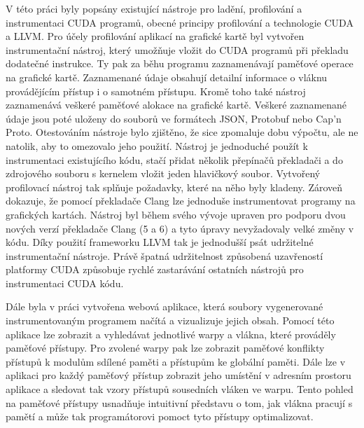 V této práci byly popsány existující nástroje pro ladění, profilování a instrumentaci CUDA programů, obecné principy profilování a technologie CUDA a LLVM. Pro účely profilování aplikací na grafické kartě byl vytvořen instrumentační nástroj, který umožňuje vložit do CUDA programů při překladu dodatečné instrukce. Ty pak za běhu programu zaznamenávají paměťové operace na grafické kartě. Zaznamenané údaje obsahují detailní informace o vláknu provádějícím přístup i o samotném přístupu. Kromě toho také nástroj zaznamenává veškeré paměťové alokace na grafické kartě. Veškeré zaznamenané údaje jsou poté uloženy do souborů ve formátech JSON, Protobuf nebo Cap'n Proto. Otestováním nástroje bylo zjištěno, že sice zpomaluje dobu výpočtu, ale ne natolik, aby to omezovalo jeho použití. Nástroj je jednoduché použít k instrumentaci existujícího kódu, stačí přidat několik přepínačů překladači a do zdrojového souboru s kernelem vložit jeden hlavičkový soubor. Vytvořený profilovací nástroj tak splňuje požadavky, které na něho byly kladeny. Zároveň dokazuje, že pomocí překladače Clang lze jednoduše instrumentovat programy na grafických kartách. Nástroj byl během svého vývoje upraven pro podporu dvou nových verzí překladače Clang (5 a 6) a tyto úpravy nevyžadovaly velké změny v kódu. Díky použití frameworku LLVM tak je jednodušší psát udržitelné instrumentační nástroje. Právě špatná udržitelnost způsobená uzavřeností platformy CUDA způsobuje rychlé zastarávání ostatních nástrojů pro instrumentaci CUDA kódu.

Dále byla v práci vytvořena webová aplikace, která soubory vygenerované instrumentovaným programem načítá a vizualizuje jejich obsah. Pomocí této aplikace lze zobrazit a vyhledávat jednotlivé warpy a vlákna, které prováděly paměťové přístupy. Pro zvolené warpy pak lze zobrazit paměťové konflikty přístupů k modulům sdílené paměti a přístupům ke globální paměti. Dále lze v aplikaci pro každý paměťový přístup zobrazit jeho umístění v adresním prostoru aplikace a sledovat tak vzory přístupů sousedních vláken ve warpu. Tento pohled na paměťové přístupy usnadňuje intuitivní představu o tom, jak vlákna pracují s pamětí a může tak programátorovi pomoct tyto přístupy optimalizovat.

